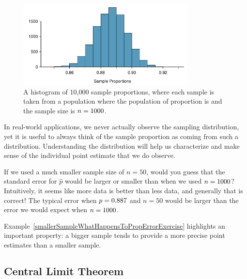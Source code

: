 \begin{figure}
   \centering
   \includegraphics[width=0.8\textwidth]{ch_inference_for_props/figures/sampling_10k_prop_887p/sampling_10k_prop_887p}
   \caption{A histogram of 10,000 sample proportions, where each
       sample is taken from a population where the population of
       proportion is \pewsolarpollprop{} and the sample size is
       $n = 1000{}$.}
   \label{sampling_10k_prop_887p}
\end{figure}

\begin{tipBox}{
  In real-world applications, we never actually observe the
  sampling distribution, yet it is useful to always think of
  the sample proportion as coming from such a distribution.
  Understanding the distribution will help us characterize
  and make sense of the individual point estimate that we
  do observe.}
\end{tipBox}

\begin{example}{If we used a much smaller sample size of $n = 50$,
would you guess that the standard error for $\hat{p}$ would be larger
or smaller than when we used $n = 1000{}$?}
\label{smallerSampleWhatHappensToPropErrorExercise}
Intuitively, it seems like more data is better
than less data, and generally that is correct! The typical error
when $p = 0.887{}$ and $n = 50$ would be larger
than the error we would expect when $n = 1000{}$.
\end{example}

Example~\ref{smallerSampleWhatHappensToPropErrorExercise}
highlights an important property: a bigger sample
tends to provide a more precise point estimates than a smaller sample.



\subsection{Central Limit Theorem}

